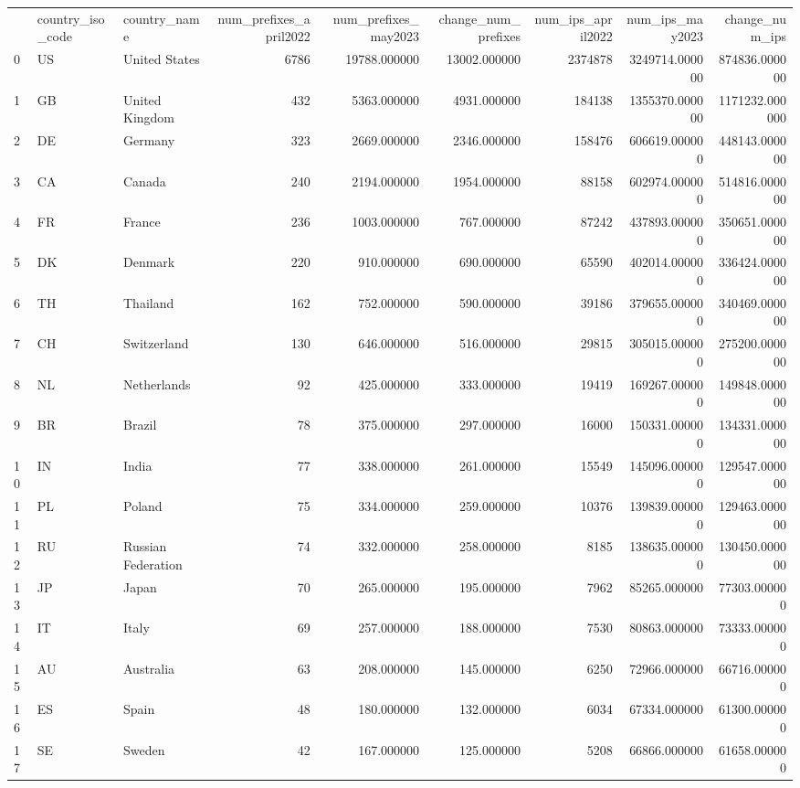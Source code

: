 \begin{tabular}{lllrrrrrr}
 & country_iso_code & country_name & num_prefixes_april2022 & num_prefixes_may2023 & change_num_prefixes & num_ips_april2022 & num_ips_may2023 & change_num_ips \\
0 & US & United States & 6786 & 19788.000000 & 13002.000000 & 2374878 & 3249714.000000 & 874836.000000 \\
1 & GB & United Kingdom & 432 & 5363.000000 & 4931.000000 & 184138 & 1355370.000000 & 1171232.000000 \\
2 & DE & Germany & 323 & 2669.000000 & 2346.000000 & 158476 & 606619.000000 & 448143.000000 \\
3 & CA & Canada & 240 & 2194.000000 & 1954.000000 & 88158 & 602974.000000 & 514816.000000 \\
4 & FR & France & 236 & 1003.000000 & 767.000000 & 87242 & 437893.000000 & 350651.000000 \\
5 & DK & Denmark & 220 & 910.000000 & 690.000000 & 65590 & 402014.000000 & 336424.000000 \\
6 & TH & Thailand & 162 & 752.000000 & 590.000000 & 39186 & 379655.000000 & 340469.000000 \\
7 & CH & Switzerland & 130 & 646.000000 & 516.000000 & 29815 & 305015.000000 & 275200.000000 \\
8 & NL & Netherlands & 92 & 425.000000 & 333.000000 & 19419 & 169267.000000 & 149848.000000 \\
9 & BR & Brazil & 78 & 375.000000 & 297.000000 & 16000 & 150331.000000 & 134331.000000 \\
10 & IN & India & 77 & 338.000000 & 261.000000 & 15549 & 145096.000000 & 129547.000000 \\
11 & PL & Poland & 75 & 334.000000 & 259.000000 & 10376 & 139839.000000 & 129463.000000 \\
12 & RU & Russian Federation & 74 & 332.000000 & 258.000000 & 8185 & 138635.000000 & 130450.000000 \\
13 & JP & Japan & 70 & 265.000000 & 195.000000 & 7962 & 85265.000000 & 77303.000000 \\
14 & IT & Italy & 69 & 257.000000 & 188.000000 & 7530 & 80863.000000 & 73333.000000 \\
15 & AU & Australia & 63 & 208.000000 & 145.000000 & 6250 & 72966.000000 & 66716.000000 \\
16 & ES & Spain & 48 & 180.000000 & 132.000000 & 6034 & 67334.000000 & 61300.000000 \\
17 & SE & Sweden & 42 & 167.000000 & 125.000000 & 5208 & 66866.000000 & 61658.000000 \\

\end{tabular}
